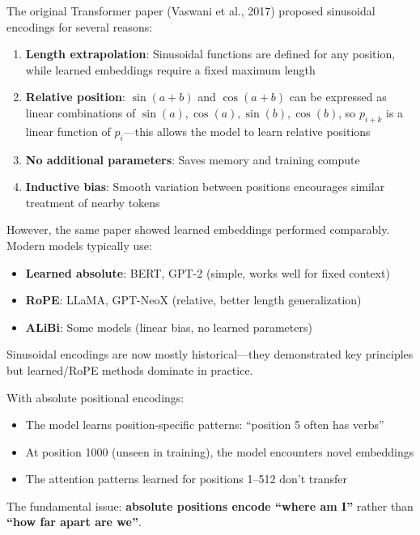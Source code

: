 \begin{remark}
    The original Transformer paper (Vaswani et al., 2017) proposed sinusoidal encodings for several reasons:
    \begin{enumerate}
        \item \textbf{Length extrapolation}: Sinusoidal functions are defined for any position, while learned embeddings require a fixed maximum length
        \item \textbf{Relative position}: $\sin(a+b)$ and $\cos(a+b)$ can be expressed as linear combinations of $\sin(a), \cos(a), \sin(b), \cos(b)$, so $p_{i+k}$ is a linear function of $p_i$---this allows the model to learn relative positions
        \item \textbf{No additional parameters}: Saves memory and training compute
        \item \textbf{Inductive bias}: Smooth variation between positions encourages similar treatment of nearby tokens
    \end{enumerate}

    However, the same paper showed learned embeddings performed comparably. Modern models typically use:
    \begin{itemize}
        \item \textbf{Learned absolute}: BERT, GPT-2 (simple, works well for fixed context)
        \item \textbf{RoPE}: LLaMA, GPT-NeoX (relative, better length generalization)
        \item \textbf{ALiBi}: Some models (linear bias, no learned parameters)
    \end{itemize}

    Sinusoidal encodings are now mostly historical---they demonstrated key principles but learned/RoPE methods dominate in practice.
\end{remark}

\begin{remark}
    With absolute positional encodings:
    \begin{itemize}
        \item The model learns position-specific patterns: ``position 5 often has verbs''
        \item At position 1000 (unseen in training), the model encounters novel embeddings
        \item The attention patterns learned for positions 1--512 don't transfer
    \end{itemize}

    The fundamental issue: \textbf{absolute positions encode ``where am I''} rather than \textbf{``how far apart are we''}.
\end{remark}

